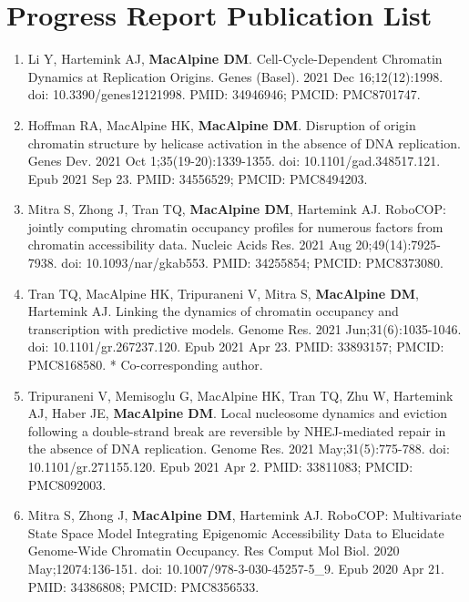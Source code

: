 \section*{Progress Report Publication List}
\begin{enumerate}
\item Li Y, Hartemink AJ, {\color{dukeblue}\textbf{MacAlpine DM}}. Cell-Cycle-Dependent Chromatin Dynamics at Replication Origins. Genes (Basel). 2021 Dec 16;12(12):1998. doi: 10.3390/genes12121998. PMID: 34946946; PMCID: PMC8701747.

\item Hoffman RA, MacAlpine HK, {\color{dukeblue}\textbf{MacAlpine DM}}. Disruption of origin chromatin structure by helicase activation in the absence of DNA replication. Genes Dev. 2021 Oct 1;35(19-20):1339-1355. doi: 10.1101/gad.348517.121. Epub 2021 Sep 23. PMID: 34556529; PMCID: PMC8494203.

\item Mitra S, Zhong J, Tran TQ, {\color{dukeblue}\textbf{MacAlpine DM}}, Hartemink AJ. RoboCOP: jointly computing chromatin occupancy profiles for numerous factors from chromatin accessibility data. Nucleic Acids Res. 2021 Aug 20;49(14):7925-7938. doi: 10.1093/nar/gkab553. PMID: 34255854; PMCID: PMC8373080.

\item Tran TQ, MacAlpine HK, Tripuraneni V, Mitra S, {\color{dukeblue}\textbf{MacAlpine DM}}, Hartemink AJ. Linking the dynamics of chromatin occupancy and transcription with predictive models. Genome Res. 2021 Jun;31(6):1035-1046. doi: 10.1101/gr.267237.120. Epub 2021 Apr 23. PMID: 33893157; PMCID: PMC8168580. * Co-corresponding author.

\item Tripuraneni V, Memisoglu G, MacAlpine HK, Tran TQ, Zhu W, Hartemink AJ, Haber JE, {\color{dukeblue}\textbf{MacAlpine DM}}. Local nucleosome dynamics and eviction following a double-strand break are reversible by NHEJ-mediated repair in the absence of DNA replication. Genome Res. 2021 May;31(5):775-788. doi: 10.1101/gr.271155.120. Epub 2021 Apr 2. PMID: 33811083; PMCID: PMC8092003.

\item Mitra S, Zhong J, {\color{dukeblue}\textbf{MacAlpine DM}}, Hartemink AJ. RoboCOP: Multivariate State Space Model Integrating Epigenomic Accessibility Data to Elucidate Genome-Wide Chromatin Occupancy. Res Comput Mol Biol. 2020 May;12074:136-151. doi: 10.1007/978-3-030-45257-5\_9. Epub 2020 Apr 21. PMID: 34386808; PMCID: PMC8356533.


\end{enumerate}
